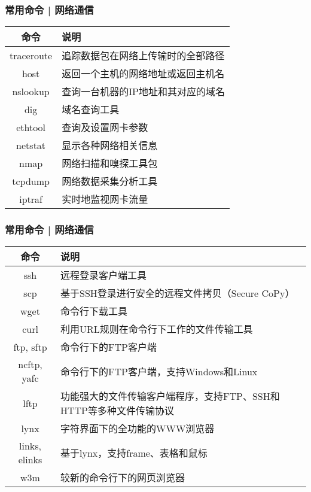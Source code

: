 \begin{frame}
  \frametitle{常用命令 | 网络通信}
  \begin{table}
    \centering
    \begin{tabularx}{0.8\textwidth}{cX}
      \hline
      \rowcolor{blue!50}命令 & 说明\\
      \hline
      traceroute & 追踪数据包在网络上传输时的全部路径\\
      host & 返回一个主机的网络地址或返回主机名\\
      nslookup & 查询一台机器的IP地址和其对应的域名\\
      dig & 域名查询工具\\
      ethtool & 查询及设置网卡参数\\
      netstat & 显示各种网络相关信息\\
      nmap & 网络扫描和嗅探工具包\\
      tcpdump & 网络数据采集分析工具\\
      iptraf & 实时地监视网卡流量\\
      \hline
    \end{tabularx}
  \end{table}
\end{frame}

\begin{frame}[fragile]
  \frametitle{常用命令 | 网络通信}
  \begin{table}
    \centering
    \begin{tabularx}{0.9\textwidth}{cX}
      \hline
      \rowcolor{blue!50}命令 & 说明\\
      \hline
      ssh & 远程登录客户端工具\\
      scp & \footnotesize{基于SSH登录进行安全的远程文件拷贝（Secure CoPy）}\\
      wget & 命令行下载工具\\
      curl & 利用URL规则在命令行下工作的文件传输工具\\
      \hline
      ftp, sftp & 命令行下的FTP客户端\\
      ncftp, yafc & 命令行下的FTP客户端，支持Windows和Linux\\
      lftp & 功能强大的文件传输客户端程序，支持FTP、SSH和HTTP等多种文件传输协议\\
      \hline
      lynx & 字符界面下的全功能的WWW浏览器\\
      links, elinks & 基于lynx，支持frame、表格和鼠标\\
      w3m & 较新的命令行下的网页浏览器\\
      \hline
    \end{tabularx}
  \end{table}
\end{frame}

